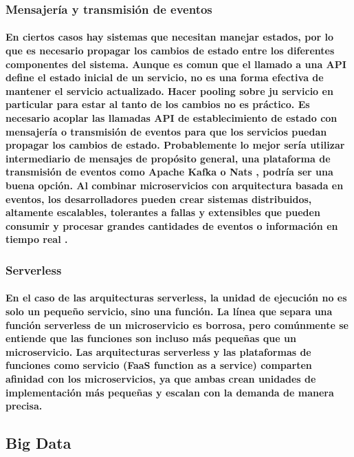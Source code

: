 \subsubsection{Mensajería y transmisión de eventos}
\paragraph{
    En ciertos casos hay sistemas que necesitan manejar estados, por lo que es necesario propagar los cambios de estado entre los diferentes componentes del sistema. Aunque es comun que el llamado a una API define el estado inicial de un servicio, no es una forma efectiva de mantener el servicio actualizado. Hacer pooling sobre ju servicio en particular para estar al tanto de los cambios no es práctico. Es necesario acoplar las llamadas API de establecimiento de estado con mensajería o transmisión de eventos para que los servicios puedan propagar los cambios de estado. Probablemente lo mejor sería utilizar intermediario de mensajes de propósito general, una plataforma de transmisión de eventos como Apache Kafka \cite{BibEntry2022Apr} o Nats \cite{nats} \cite{micronats}, podría ser una buena opción. Al combinar microservicios con arquitectura basada en eventos, los desarrolladores pueden crear sistemas distribuidos, altamente escalables, tolerantes a fallas y extensibles que pueden consumir y procesar grandes cantidades de eventos o información en tiempo real \cite{ibmmicroservicios}.
}

\subsubsection{Serverless}
\paragraph{
    En el caso de las arquitecturas serverless, la unidad de ejecución no es solo un pequeño servicio, sino una función. La línea que separa una función serverless de un microservicio es borrosa, pero comúnmente se entiende que las funciones son incluso más pequeñas que un microservicio.
    Las arquitecturas serverless y las plataformas de funciones como servicio (FaaS function as a service) comparten afinidad con los microservicios, ya que ambas crean unidades de implementación más pequeñas y escalan con la demanda de manera precisa\cite{ibmmicroservicios}.
}


\subsection{Big Data}

